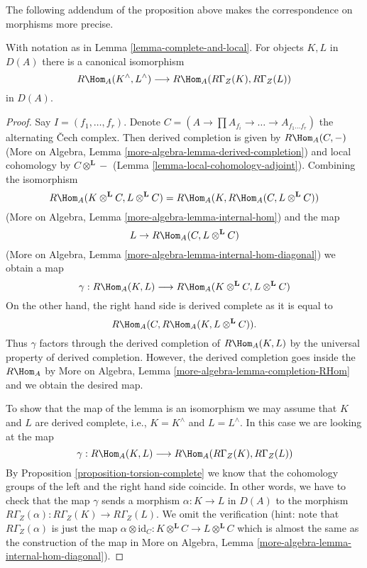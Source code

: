 \noindent
The following addendum of the proposition above makes the
correspondence on morphisms more precise.

\begin{lemma}
\label{lemma-compare-RHom}
With notation as in Lemma \ref{lemma-complete-and-local}.
For objects $K, L$ in $D(A)$ there is a canonical isomorphism
$$
R\Hom_A(K^\wedge, L^\wedge) \longrightarrow R\Hom_A(R\Gamma_Z(K), R\Gamma_Z(L))
$$
in $D(A)$.
\end{lemma}

\begin{proof}
Say $I = (f_1, \ldots, f_r)$. Denote
$C = (A \to \prod A_{f_i} \to \ldots \to A_{f_1 \ldots f_r})$ the
alternating {\v C}ech complex. Then derived completion is given by
$R\Hom_A(C, -)$ (More on Algebra, Lemma
\ref{more-algebra-lemma-derived-completion}) and local cohomology by
$C \otimes^\mathbf{L} -$ (Lemma \ref{lemma-local-cohomology-adjoint}).
Combining the isomorphism
$$
R\Hom_A(K \otimes^\mathbf{L} C, L \otimes^\mathbf{L} C) =
R\Hom_A(K, R\Hom_A(C,  L \otimes^\mathbf{L} C))
$$
(More on Algebra, Lemma \ref{more-algebra-lemma-internal-hom})
and the map
$$
L \to R\Hom_A(C,  L \otimes^\mathbf{L} C)
$$
(More on Algebra, Lemma \ref{more-algebra-lemma-internal-hom-diagonal})
we obtain a map
$$
\gamma :
R\Hom_A(K, L)
\longrightarrow
R\Hom_A(K \otimes^\mathbf{L} C, L \otimes^\mathbf{L} C)
$$
On the other hand, the right hand side is derived complete as it is
equal to
$$
R\Hom_A(C, R\Hom_A(K, L \otimes^\mathbf{L} C)).
$$
Thus $\gamma$ factors through the derived completion of
$R\Hom_A(K, L)$ by the universal property of derived completion.
However, the derived completion goes inside the $R\Hom_A$ by
More on Algebra, Lemma \ref{more-algebra-lemma-completion-RHom}
and we obtain the desired map.

\medskip\noindent
To show that the map of the lemma is an isomorphism
we may assume that $K$ and $L$ are derived complete, i.e.,
$K = K^\wedge$ and $L = L^\wedge$. In this case we are
looking at the map
$$
\gamma : R\Hom_A(K, L) \longrightarrow R\Hom_A(R\Gamma_Z(K), R\Gamma_Z(L))
$$
By Proposition \ref{proposition-torsion-complete} we know that
the cohomology groups
of the left and the right hand side coincide. In other words,
we have to check that the map $\gamma$ sends a morphism
$\alpha : K \to L$ in $D(A)$ to the morphism
$R\Gamma_Z(\alpha) : R\Gamma_Z(K) \to R\Gamma_Z(L)$.
We omit the verification (hint: note that $R\Gamma_Z(\alpha)$
is just the map
$\alpha \otimes \text{id}_C :
K \otimes^\mathbf{L} C
\to
L \otimes^\mathbf{L} C$ which is almost the same as the
construction of the map in
More on Algebra, Lemma \ref{more-algebra-lemma-internal-hom-diagonal}).
\end{proof}

